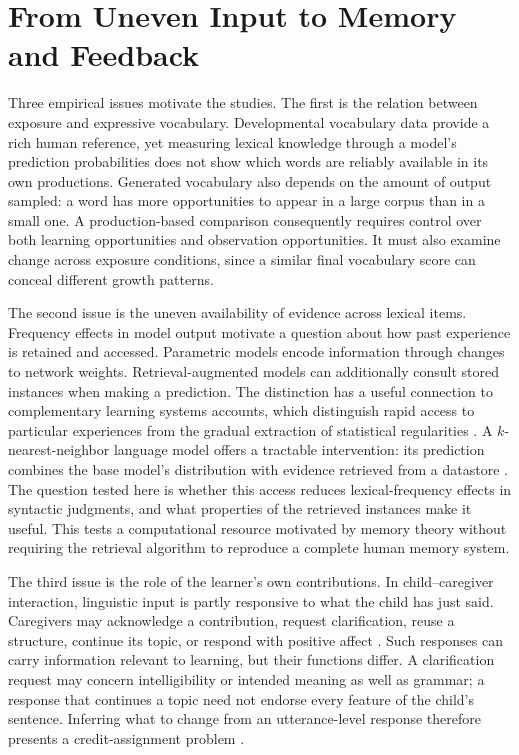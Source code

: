 \section{From Uneven Input to Memory and Feedback}
\label{sec:intro:background}

Three empirical issues motivate the studies. The first is the relation between exposure and expressive vocabulary. Developmental vocabulary data provide a rich human reference, yet measuring lexical knowledge through a model's prediction probabilities does not show which words are reliably available in its own productions. Generated vocabulary also depends on the amount of output sampled: a word has more opportunities to appear in a large corpus than in a small one. A production-based comparison consequently requires control over both learning opportunities and observation opportunities. It must also examine change across exposure conditions, since a similar final vocabulary score can conceal different growth patterns.

The second issue is the uneven availability of evidence across lexical items. Frequency effects in model output motivate a question about how past experience is retained and accessed. Parametric models encode information through changes to network weights. Retrieval-augmented models can additionally consult stored instances when making a prediction. The distinction has a useful connection to complementary learning systems accounts, which distinguish rapid access to particular experiences from the gradual extraction of statistical regularities \citep{mcclelland1995there,kumaran2016learning}. A $k$-nearest-neighbor language model offers a tractable intervention: its prediction combines the base model's distribution with evidence retrieved from a datastore \citep{khandelwal2020knnlm}. The question tested here is whether this access reduces lexical-frequency effects in syntactic judgments, and what properties of the retrieved instances make it useful. This tests a computational resource motivated by memory theory without requiring the retrieval algorithm to reproduce a complete human memory system.

The third issue is the role of the learner's own contributions. In child--caregiver interaction, linguistic input is partly responsive to what the child has just said. Caregivers may acknowledge a contribution, request clarification, reuse a structure, continue its topic, or respond with positive affect \citep{demetras_feedback_1986,clark_conversational_2020,fusaroli_caregiver_2023}. Such responses can carry information relevant to learning, but their functions differ. A clarification request may concern intelligibility or intended meaning as well as grammar; a response that continues a topic need not endorse every feature of the child's sentence. Inferring what to change from an utterance-level response therefore presents a credit-assignment problem \citep{marcus_negative_1993}.

